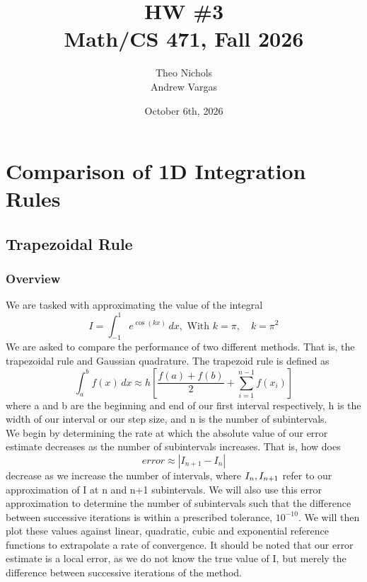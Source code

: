 \documentclass[12pt]{article}
\title{ HW \#3 \\ Math/CS 471, Fall 2026}
\author{Theo Nichols \\ Andrew Vargas}
\date{October 6th, 2026}   %
\begin{document}
\maketitle
\clearpage

\section{Comparison of 1D Integration Rules}

\subsection{Trapezoidal Rule}

\subsubsection{Overview}
We are tasked with approximating the value of the integral
\begin{equation}
I = \int_{-1}^{1} e^{\cos(kx)}\,dx, \text{ With } k=\pi,\quad k=\pi^2
\end{equation}
We are asked to compare the performance of two different methods. That is, the trapezoidal rule and Gaussian quadrature. The trapezoid rule is defined as \\
\begin{equation}
\int_a^b f(x) \, dx \approx h \left[ \frac{f(a) + f(b)}{2} + \sum_{i=1}^{n-1} f(x_i) \right]
\end{equation}
where a and b are the beginning and end of our first interval respectively, h is the width of our interval or our step size, and n is the number of subintervals. 
\\We begin by determining the rate at which the absolute value of our error estimate decreases as the number of subintervals increases. That is, how does 
\begin{equation}
    error \approx |I_{n+1} - I_n|
\end{equation}
decrease as we increase the number of intervals, where $I_n, \space I_{n+1}$ refer to our approximation of I at n and n+1 subintervals. We will also use this error approximation to determine the number of subintervals such that the difference between successive iterations is within a prescribed tolerance, $10^{-10}$. We will then plot these values against linear, quadratic, cubic and exponential reference functions to extrapolate a rate of convergence. It should be noted that our error estimate is a local error, as we do not know the true value of I, but merely the difference between successive iterations of the method.
\\
\end{document}
